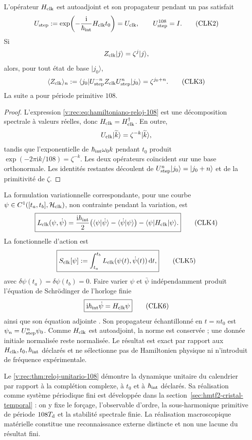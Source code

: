 \begin{theorem}
\label{v:rec:thm:reloj-unitario-108}
L’opérateur \(H_{\rm clk}\) est autoadjoint et son propagateur pendant un pas
satisfait
\[
 U_{\rm step}
 :=\exp\!\left(-\frac{\mathrm i}{\hbar_{\rm int}}
 H_{\rm clk}t_0\right)
 =U_{\rm clk},
 \qquad
 U_{\rm step}^{108}=I.
 \tag{CLK2}\label{v:rec:eq:propagador-reloj-108}
\]
Si
\[
 Z_{\rm clk}|j\rangle=\zeta^j|j\rangle,
\]
alors, pour tout état de base \(|j_0\rangle\),
\[
 \langle Z_{\rm clk}\rangle_{n}
 :=\langle j_0|U_{\rm step}^{-n}Z_{\rm clk}
 U_{\rm step}^n|j_0\rangle
 =\zeta^{j_0+n}.
 \tag{CLK3}\label{v:rec:eq:respuesta-reloj-108}
\]
La suite a pour période primitive \(108\).
\end{theorem}

\begin{proof}
L’expression \eqref{v:rec:eq:hamiltoniano-reloj-108} est une décomposition
spectrale à valeurs réelles, donc \(H_{\rm clk}=H_{\rm clk}^\dagger\).
En outre,
\[
 U_{\rm clk}|\widetilde k\rangle
 =\zeta^{-k}|\widetilde k\rangle,
\]
tandis que l’exponentielle de
\(\hbar_{\rm int}\omega_0 k\) pendant \(t_0\) produit
\(\exp(-2\pi\mathrm ik/108)=\zeta^{-k}\). Les deux opérateurs coïncident sur
une base orthonormale. Les identités restantes découlent de
\(U_{\rm step}^n|j_0\rangle=|j_0+n\rangle\) et de la primitivité de
\(\zeta\).
\end{proof}

La formulation variationnelle correspondante, pour une courbe
\(\psi\in C^1([t_a,t_b],\mathcal H_{\rm clk})\), non contrainte pendant la
variation, est
\[
 \boxed{
 L_{\rm clk}(\psi,\dot\psi)
 =\frac{\mathrm i\hbar_{\rm int}}2
 \bigl(
 \langle\psi|\dot\psi\rangle
 -\langle\dot\psi|\psi\rangle
 \bigr)
 -\langle\psi|H_{\rm clk}|\psi\rangle.}
 \tag{CLK4}\label{v:rec:eq:lagrangiano-reloj-108}
\]
La fonctionnelle d’action est
\[
 \boxed{
 S_{\rm clk}[\psi]
 :=\int_{t_a}^{t_b}
 L_{\rm clk}(\psi(t),\dot\psi(t))\,\mathrm dt,}
 \tag{CLK5}\label{v:rec:eq:accion-reloj-108}
\]
avec \(\delta\psi(t_a)=\delta\psi(t_b)=0\).
Faire varier \(\psi\) et \(\bar\psi\) indépendamment produit l’équation de
Schrödinger de l’horloge finie
\[
 \boxed{\mathrm i\hbar_{\rm int}\dot\psi=H_{\rm clk}\psi}
 \tag{CLK6}\label{v:rec:eq:schrodinger-reloj-108}
\]
ainsi que son équation adjointe \cite{SchrodingerNobel}. Son propagateur échantillonné
en \(t=nt_0\) est \(\psi_n=U_{\rm step}^{n}\psi_0\). Comme \(H_{\rm clk}\) est
autoadjoint, la norme est conservée ; une donnée initiale normalisée reste
normalisée. Le résultat est exact par rapport aux
\(H_{\rm clk},t_0,\hbar_{\rm int}\) déclarés et ne sélectionne pas de Hamiltonien
physique ni n’introduit de fréquence expérimentale.

Le \cref{v:rec:thm:reloj-unitario-108} démontre la dynamique unitaire du calendrier
par rapport à la complétion complexe, à \(t_0\) et à \(\hbar_{\rm int}\)
déclarés. Sa réalisation comme système périodique fini est développée
dans la section~\ref{sec:hmtf2-cristal-temporal} : on y
fixe le forçage, l’observable d’ordre, la sous-harmonique primitive de période
\(108T_{\rm d}\) et la stabilité spectrale finie. La réalisation
macroscopique matérielle constitue une reconnaissance externe distincte et non une
lacune du résultat fini.
